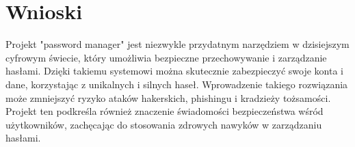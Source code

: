 \section{Wnioski}
Projekt "password manager" jest niezwykle przydatnym narzędziem w dzisiejszym cyfrowym świecie, który umożliwia bezpieczne przechowywanie i zarządzanie hasłami. Dzięki takiemu systemowi można skutecznie zabezpieczyć swoje konta i dane, korzystając z unikalnych i silnych haseł. Wprowadzenie takiego rozwiązania może zmniejszyć ryzyko ataków hakerskich, phishingu i kradzieży tożsamości. Projekt ten podkreśla również znaczenie świadomości bezpieczeństwa wśród użytkowników, zachęcając do stosowania zdrowych nawyków w zarządzaniu hasłami.
